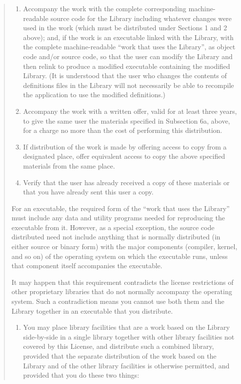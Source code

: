 \documentclass[
]{book}
\providecommand{\tightlist}{%
  \setlength{\itemsep}{0pt}\setlength{\parskip}{0pt}}
\theoremstyle{definition}
\theoremstyle{definition}
\theoremstyle{definition}
\theoremstyle{definition}
\theoremstyle{remark}
\begin{document}
\begin{quote}
\begin{enumerate}
\def\labelenumi{\alph{enumi})}
\item
  Accompany the work with the complete corresponding
  machine-readable source code for the Library including whatever
  changes were used in the work (which must be distributed under
  Sections 1 and 2 above); and, if the work is an executable linked
  with the Library, with the complete machine-readable ``work that
  uses the Library'', as object code and/or source code, so that the
  user can modify the Library and then relink to produce a modified
  executable containing the modified Library. (It is understood
  that the user who changes the contents of definitions files in the
  Library will not necessarily be able to recompile the application
  to use the modified definitions.)
\item
  Accompany the work with a written offer, valid for at
  least three years, to give the same user the materials
  specified in Subsection 6a, above, for a charge no more
  than the cost of performing this distribution.
\item
  If distribution of the work is made by offering access to copy
  from a designated place, offer equivalent access to copy the above
  specified materials from the same place.
\item
  Verify that the user has already received a copy of these
  materials or that you have already sent this user a copy.
\end{enumerate}

For an executable, the required form of the ``work that uses the
Library'' must include any data and utility programs needed for
reproducing the executable from it. However, as a special
exception, the source code distributed need not include anything
that is normally distributed (in either source or binary form)
with the major components (compiler, kernel, and so on) of the
operating system on which the executable runs, unless that
component itself accompanies the executable.

It may happen that this requirement contradicts the license
restrictions of other proprietary libraries that do not normally
accompany the operating system. Such a contradiction means you
cannot use both them and the Library together in an executable
that you distribute.

\begin{enumerate}
\def\labelenumi{\arabic{enumi}.}
\setcounter{enumi}{6}
\tightlist
\item
  You may place library facilities that are a work based on the
  Library side-by-side in a single library together with other
  library facilities not covered by this License, and distribute
  such a combined library, provided that the separate distribution
  of the work based on the Library and of the other library
  facilities is otherwise permitted, and provided that you do
  these two things:
\end{enumerate}


\end{quote}
\end{document}
